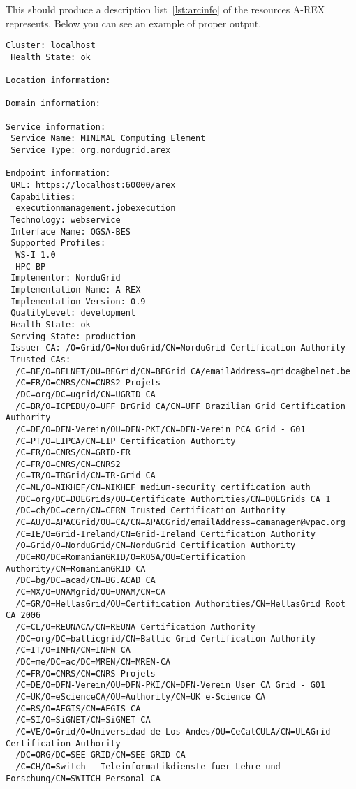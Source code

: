 \documentclass{article}                            %
\begin{document}
This should produce a description list~\ref{lst:arcinfo} of the resources A-REX
represents. Below you can see an example of proper output.

\begin{lstlisting}[caption={Example of proper arcinfo output},label=lst:arcinfo]
Cluster: localhost
 Health State: ok

Location information:

Domain information:

Service information:
 Service Name: MINIMAL Computing Element
 Service Type: org.nordugrid.arex

Endpoint information:
 URL: https://localhost:60000/arex
 Capabilities:
  executionmanagement.jobexecution
 Technology: webservice
 Interface Name: OGSA-BES
 Supported Profiles:
  WS-I 1.0
  HPC-BP
 Implementor: NorduGrid
 Implementation Name: A-REX
 Implementation Version: 0.9
 QualityLevel: development
 Health State: ok
 Serving State: production
 Issuer CA: /O=Grid/O=NorduGrid/CN=NorduGrid Certification Authority
 Trusted CAs:
  /C=BE/O=BELNET/OU=BEGrid/CN=BEGrid CA/emailAddress=gridca@belnet.be
  /C=FR/O=CNRS/CN=CNRS2-Projets
  /DC=org/DC=ugrid/CN=UGRID CA
  /C=BR/O=ICPEDU/O=UFF BrGrid CA/CN=UFF Brazilian Grid Certification Authority
  /C=DE/O=DFN-Verein/OU=DFN-PKI/CN=DFN-Verein PCA Grid - G01
  /C=PT/O=LIPCA/CN=LIP Certification Authority
  /C=FR/O=CNRS/CN=GRID-FR
  /C=FR/O=CNRS/CN=CNRS2
  /C=TR/O=TRGrid/CN=TR-Grid CA
  /C=NL/O=NIKHEF/CN=NIKHEF medium-security certification auth
  /DC=org/DC=DOEGrids/OU=Certificate Authorities/CN=DOEGrids CA 1
  /DC=ch/DC=cern/CN=CERN Trusted Certification Authority
  /C=AU/O=APACGrid/OU=CA/CN=APACGrid/emailAddress=camanager@vpac.org
  /C=IE/O=Grid-Ireland/CN=Grid-Ireland Certification Authority
  /O=Grid/O=NorduGrid/CN=NorduGrid Certification Authority
  /DC=RO/DC=RomanianGRID/O=ROSA/OU=Certification Authority/CN=RomanianGRID CA
  /DC=bg/DC=acad/CN=BG.ACAD CA
  /C=MX/O=UNAMgrid/OU=UNAM/CN=CA
  /C=GR/O=HellasGrid/OU=Certification Authorities/CN=HellasGrid Root CA 2006
  /C=CL/O=REUNACA/CN=REUNA Certification Authority
  /DC=org/DC=balticgrid/CN=Baltic Grid Certification Authority
  /C=IT/O=INFN/CN=INFN CA
  /DC=me/DC=ac/DC=MREN/CN=MREN-CA
  /C=FR/O=CNRS/CN=CNRS-Projets
  /C=DE/O=DFN-Verein/OU=DFN-PKI/CN=DFN-Verein User CA Grid - G01
  /C=UK/O=eScienceCA/OU=Authority/CN=UK e-Science CA
  /C=RS/O=AEGIS/CN=AEGIS-CA
  /C=SI/O=SiGNET/CN=SiGNET CA
  /C=VE/O=Grid/O=Universidad de Los Andes/OU=CeCalCULA/CN=ULAGrid Certification Authority
  /DC=ORG/DC=SEE-GRID/CN=SEE-GRID CA
  /C=CH/O=Switch - Teleinformatikdienste fuer Lehre und Forschung/CN=SWITCH Personal CA

\end{lstlisting}
\end{document}
